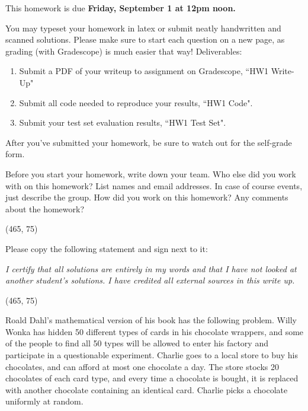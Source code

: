\documentclass[11pt]{article}
\begin{document}
\fontsize{12}{15}\selectfont

This homework is due \textbf{Friday, September 1 at 12pm noon.}


You may typeset your homework in latex or submit neatly handwritten and scanned solutions. Please make sure to start each question on a new page, as grading (with Gradescope) is much easier that way! Deliverables:

\begin{enumerate}
  \item Submit a PDF of your writeup to assignment on Gradescope, ``HW1 Write-Up"
  \item Submit all code needed to reproduce your results, ``HW1 Code".
  \item Submit your test set evaluation results, ``HW1 Test Set".
\end{enumerate}

After you've submitted your homework, be sure to watch out for the self-grade form.

\begin{Parts}

\Part Before you start your homework, write down your team. Who else did you work with on this homework? List names and email addresses. In case of course events, just describe the group. How did you work on this homework? Any comments about the homework?

\vspace{15pt}
\framebox(465, 75){}

\Part Please copy the following statement and sign next to it:

\textit{I certify that all solutions are entirely in my words and that I have not looked at another student's solutions. I have credited all external sources in this write up.}

\vspace{15pt}
\framebox(465, 75){}

\end{Parts}

\pagebreak
{}

Roald Dahl's mathematical version of his book has the following
problem. Willy Wonka has hidden 50 different types of cards in his
chocolate wrappers, and some of the people to find all 50 types will
be allowed to enter his factory and participate in a questionable
experiment. Charlie goes to a local store to buy his chocolates, and
can afford at most one chocolate a day. The store stocks 20 chocolates
of each card type, and every time a chocolate is bought, it is
replaced with another chocolate containing an identical card. Charlie
picks a chocolate uniformly at random. 
\end{document}
